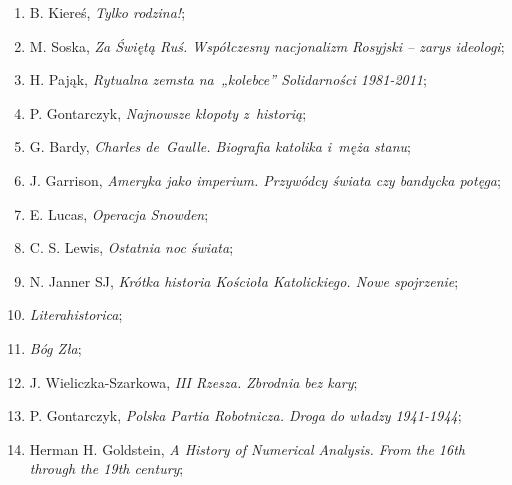 \documentclass[a4paper,11pt]{article}
\begin{document}
\begin{enumerate}
\item B. Kiereś, \textit{Tylko rodzina!};



\item M. Soska, \textit{Za Świętą Ruś. Współczesny nacjonalizm Rosyjski
    -- zarys ideologi};



\item H. Pająk, \textit{Rytualna zemsta na~„kolebce” Solidarności
    1981-2011};



\item P. Gontarczyk, \textit{Najnowsze kłopoty z~historią};



\item G. Bardy, \textit{Charles de~Gaulle. Biografia katolika i~męża
    stanu};



\item J. Garrison, \textit{Ameryka jako imperium. Przywódcy świata czy
    bandycka potęga};



\item E. Lucas, \textit{Operacja Snowden};



\item C. S. Lewis, \textit{Ostatnia noc świata};



\item N. Janner SJ, \textit{Krótka historia Kościoła Katolickiego. Nowe
    spojrzenie};



\item \textit{Literahistorica};



\item \textit{Bóg Zła};



\item J. Wieliczka-Szarkowa, \textit{III Rzesza. Zbrodnia bez kary};



\item P. Gontarczyk, \textit{Polska Partia Robotnicza. Droga do władzy
    1941-1944};



\item Herman H. Goldstein, \textit{A History of Numerical Analysis. From
    the 16th through the 19th century};




\end{enumerate}
\end{document}
